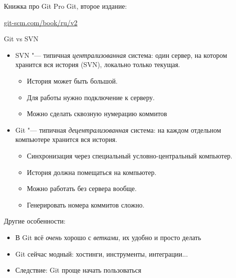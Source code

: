 \begin{frame}[t]{Книжка про Git}
Pro Git, второе издание:
\begin{center}
\href{https://git-scm.com/book/ru/v2/}{git-scm.com/book/ru/v2}
\end{center}
\end{frame}

\begin{frame}[t]{Git vs SVN}
\begin{itemize}
\item SVN "--- типичная \textit{централизованная} система: один сервер, на котором хранится вся история (SVN), локально только текущая.
	\begin{itemize}
	\item История может быть большой.
	\item Для работы нужно подключение к серверу.
	\item Можно сделать сквозную нумерацию коммитов
	\end{itemize}
\item Git "--- типичная \textit{децентрализованная} система: на каждом отдельном компьютере хранится вся история.
	\begin{itemize}
	\item Синхронизация через специальный условно-центральный компьютер.
	\item История должна помещаться на компьютер.
	\item Можно работать без сервера вообще.
	\item Генерировать номера коммитов сложно.
	\end{itemize}
\end{itemize}
	Другие особенности:
\begin{itemize}
\item В Git всё \textit{очень} хорошо с \textit{ветками}, их удобно и просто делать
\item Git сейчас модный: хостинги, инструменты, интеграции...
\item Следствие: Git проще начать пользоваться
\end{itemize}
\end{frame}

